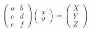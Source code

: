 \documentclass[preview]{standalone}
\begin{document}
\begin{align*}
\begin{pmatrix} a & b \\ c & d \\ e & f \end{pmatrix} \begin{pmatrix} x \\ y \end{pmatrix} = \begin{pmatrix} X \\ Y \\ Z \end{pmatrix}
\end{align*}
\end{document}
